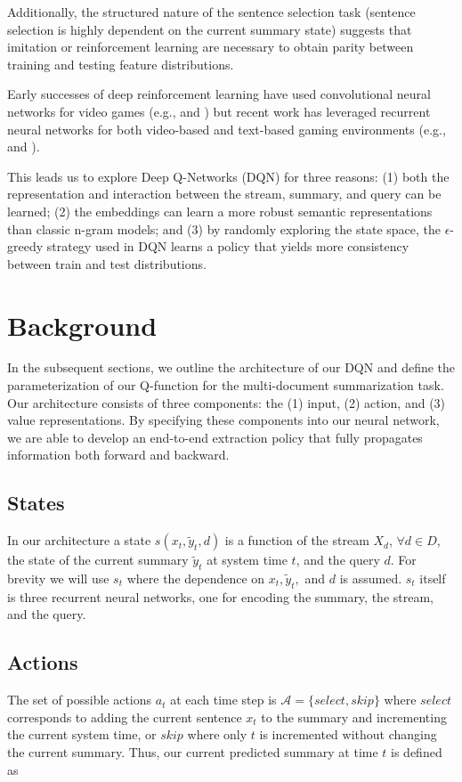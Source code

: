 \documentclass[12pt]{article}
\begin{document}
Additionally, the structured nature of the sentence selection task (sentence selection is highly dependent on the current summary state) suggests that imitation or reinforcement learning are necessary to obtain parity between training and testing feature distributions. 

Early successes of deep reinforcement learning have used convolutional neural networks for video games (e.g., \cite{MnihBMGLHSK16} and \cite{MnihKSGAWR13}) but recent work has leveraged recurrent neural networks for both video-based and text-based gaming environments (e.g., \cite{hausknecht2015deep} and \cite{narasimhan2015language}). 

This leads us to explore Deep Q-Networks (DQN) for three reasons: (1) both the representation and interaction between the stream, summary, and 
query can be learned; (2) the embeddings can learn a more robust semantic representations than classic n-gram models; and (3) by randomly exploring the state space, the $\epsilon$-greedy strategy used in DQN learns a policy that yields more consistency between train and test distributions.

\section{Background}

In the subsequent sections, we outline the architecture of our DQN and define the parameterization of our Q-function for the multi-document summarization task. Our architecture consists of three components: the (1) input, (2) action, and (3) value representations. By specifying these components into our neural network, we are able to develop an end-to-end extraction policy that fully propagates information both forward and backward.

\subsection{States}  

In our architecture a state $s(x_{t},\tilde{y}_{t}, d)$ is a function of the stream $X_d$, $\forall d \in D$, the state of the current summary $\tilde{y}_t$ at system time $t$, and the query $d$. For brevity we will use $s_t$ where the dependence on $x_{t},\tilde{y}_{t},$ and $d$ is assumed. $s_t$ itself is three recurrent neural networks, one for encoding  the summary, the stream, and the query. 

\subsection{Actions} 
The set of possible actions $a_t$ at each time step is $\mathcal{A} = \{select, skip\}$ where $select$ corresponds to adding the current sentence $x_t$ to the summary and incrementing the current system time, or $skip$ where only $t$ is incremented without changing the current summary. Thus, our current predicted summary at time $t$ is defined as
\end{document}
